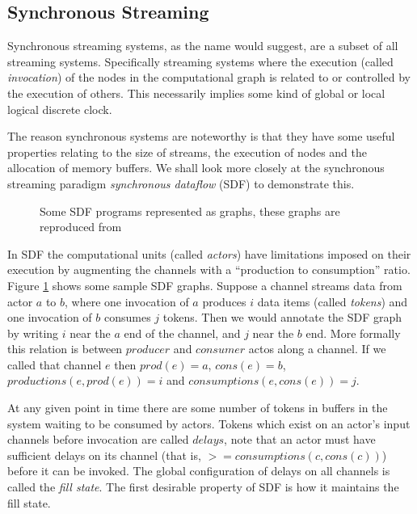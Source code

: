 \subsection{Synchronous Streaming}
\label{BACK_SYNC}

Synchronous streaming systems, as the name would suggest, are a subset of all streaming systems.
Specifically streaming systems where the execution (called {\em invocation}) of the nodes in the computational graph is related to or controlled by the execution of others.
This necessarily implies some kind of global or local logical discrete clock.

The reason synchronous systems are noteworthy is that they have some useful properties relating to the size of streams, the execution of nodes and the allocation of memory buffers.
We shall look more closely at the synchronous streaming paradigm {\em synchronous dataflow} (SDF) to demonstrate this.

\begin{figure}
\begin{center}
	
\caption{Some SDF programs represented as graphs, these graphs are reproduced from \cite{sdfBook}}
\label{figSimpleSDF}
\end{center}
\end{figure}

In SDF the computational units (called {\em actors}) have limitations imposed on their execution by augmenting the channels with a ``production to consumption'' ratio.
Figure \ref{figSimpleSDF} shows some sample SDF graphs.
Suppose a channel streams data from actor $a$ to $b$, where one invocation of $a$ produces $i$ data items (called {\em tokens}) and one invocation of $b$ consumes $j$ tokens.
Then we would annotate the SDF graph by writing $i$ near the $a$ end of the channel, and $j$ near the $b$ end.
More formally this relation is between $producer$ and $consumer$ actos along a channel.
If we called that channel $e$ then $prod(e) = a$, $cons(e) = b$, $productions(e, prod(e)) = i$ and $consumptions(e, cons(e)) = j$.

At any given point in time there are some number of tokens in buffers in the system waiting to be consumed by actors.
Tokens which exist on an actor's input channels before invocation are called $delays$, note that an actor must have sufficient delays on its channel (that is, $>= consumptions(c, cons(c))$) before it can be invoked.
The global configuration of delays on all channels is called the {\em fill state}.
The first desirable property of SDF is how it maintains the fill state.

